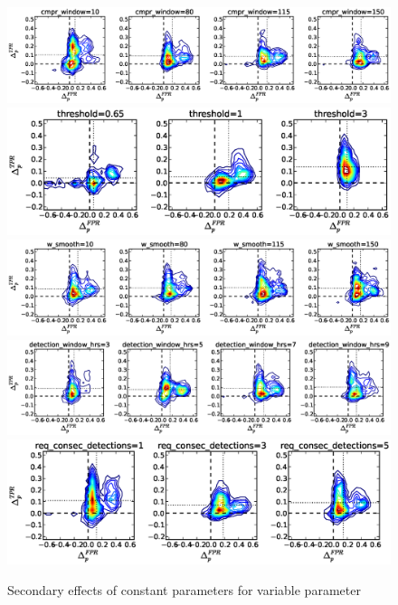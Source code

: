 \begin{figure}[!h]
\begin{center}
\includegraphics[width=6in]{../fig/final/delta_hist_sec/gamma/cmpr_window}
\includegraphics[width=6in]{../fig/final/delta_hist_sec/gamma/threshold}
\includegraphics[width=6in]{../fig/final/delta_hist_sec/gamma/w_smooth}
\includegraphics[width=6in]{../fig/final/delta_hist_sec/gamma/detection_window_hrs}
\includegraphics[width=6in]{../fig/final/delta_hist_sec/gamma/req_consec_detections}
\end{center}
\caption{\label{fig:delta_sec6} Secondary effects of constant parameters for variable parameter }
\end{figure}

